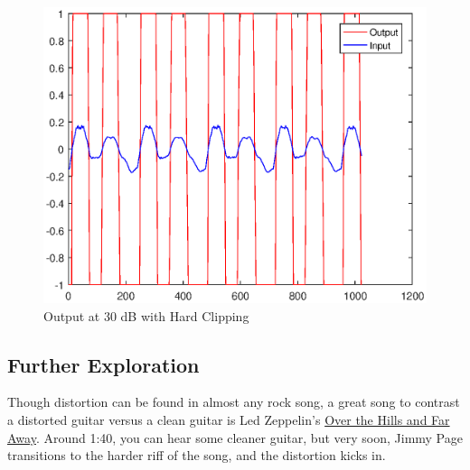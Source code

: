 \begin{figure}[ht]
    \centering
    \includegraphics[scale=0.6]{hard-clipping-waveform.eps}
    \caption{Output at 30 dB with Hard Clipping}
    \label{fig:hard-clipping-output}
\end{figure}

\subsection{Further Exploration}
Though distortion can be found in almost any rock song, a great song to contrast a distorted guitar versus a clean guitar is Led Zeppelin's \href{https://www.youtube.com/watch?v=0Az-TuYb4h0}{Over the Hills and Far Away}. Around 1:40, you can hear some cleaner guitar, but very soon, Jimmy Page transitions to the harder riff of the song, and the distortion kicks in.